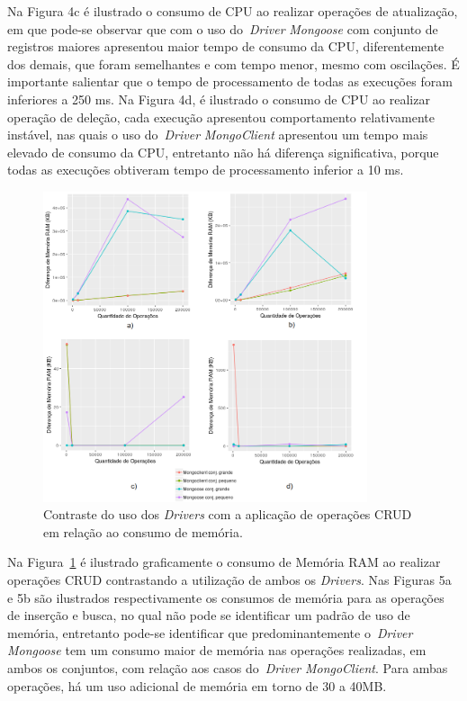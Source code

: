 \documentclass{svproc}
\begin{document}
Na Figura 4c é ilustrado o consumo de CPU ao realizar operações de atualização, em que pode-se observar que com o uso do~\emph{Driver} \emph{Mongoose} com conjunto de registros maiores apresentou maior tempo de consumo da CPU, diferentemente dos demais, que foram semelhantes e com tempo menor, mesmo com oscilações. 
É importante salientar que o tempo de processamento de todas as execuções foram inferiores a 250 ms.
Na Figura 4d, é ilustrado o consumo de CPU ao realizar operação de deleção, cada execução apresentou comportamento relativamente instável, nas quais o uso do~\emph{Driver} \emph{MongoClient} apresentou um tempo mais elevado de consumo da CPU, entretanto não há diferença significativa, porque todas as execuções obtiveram tempo de processamento inferior a 10 ms.

\begin{figure}[!ht]
    \centering
    \includegraphics[width=0.85\textwidth]{images/memory}
	 \caption{Contraste do uso dos \emph{Drivers} com a aplicação de operações CRUD em relação ao consumo de memória.}
    \label{fig:memory}
\end{figure}

Na Figura~\ref{fig:memory} é ilustrado graficamente o consumo de Memória RAM ao realizar operações CRUD contrastando a utilização de ambos os \emph{Drivers}.
Nas Figuras 5a e 5b são ilustrados respectivamente os consumos de memória para as operações de inserção e busca, no qual não pode se identificar um padrão de uso de memória, entretanto pode-se identificar que predominantemente o~\emph{Driver} \emph{Mongoose} tem um consumo maior de memória nas operações realizadas, em ambos os conjuntos, com relação aos casos do~\emph{Driver} \emph{MongoClient}.
Para ambas operações, há um uso adicional de memória em torno de 30 a 40MB.
\end{document}
